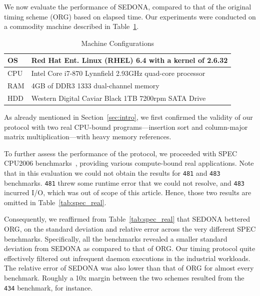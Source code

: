 \documentclass[letter]{ieice}
\begin{document}
{\color{blue}
We now evaluate the \hbox{performance} of SEDONA, 
compared to that of the original timing scheme (ORG) based on elapsed time.
Our experiments were conducted on a commodity \hbox{machine}
described in Table~\ref{tab:machine_config}. 
\vspace{-0.3in}
\begin{table}[h]
\begin{center}
{\tiny
\begin{tabular}{|l|p{6.8cm}|}\hline
OS & Red Hat Ent. Linux (RHEL) 6.4 with a kernel of 2.6.32 \\ \hline
CPU & Intel Core i7-870 Lynnfield 2.93GHz quad-core \hbox{processor}\\ \hline
RAM & 4GB of DDR3 1333 dual-channel memory\\ \hline
HDD & Western Digital Caviar Black 1TB 7200rpm SATA Drive\\ \hline
\end{tabular}
}
\end{center}
\caption{Machine Configurations\label{tab:machine_config}}
\vspace{-0.3in}
\end{table}

As already mentioned in Section~\ref{sec:intro}, we first 
confirmed the validity of our protocol with two 
real \hbox{CPU-bound} programs---insertion sort and \hbox{column-major} matrix multiplication---with heavy memory references.

To further assess the performance of the protocol, 
we proceeded with SPEC CPU2006 benchmarks~\cite{specCpu2006}, providing various 
\hbox{compute-bound} real applications.
Note that in this evaluation we could not obtain the results for {\tt 481} and {\tt 483} \hbox{benchmarks}. 
{\tt 481} threw some runtime error that we could not resolve, and {\tt 483} incurred I/O, which was out of scope of this article.
Hence, those two results are omitted in Table~\ref{tab:spec_real}.

Consequently, we reaffirmed from Table~\ref{tab:spec_real} that \hbox{SEDONA} bettered ORG,
on the standard deviation and relative error across the very different SPEC benchmarks.
Specifically, all the benchmarks revealed a smaller standard deviation 
from SEDONA as compared to that of ORG.
Our timing protocol quite effectively filtered out infrequent daemon executions 
in the industrial workloads. The relative error of SEDONA was also 
lower than that of ORG for almost every benchmark.
Roughly a 10x margin between the two schemes resulted from the {\tt 434} benchmark, for instance.
}
\end{document}
